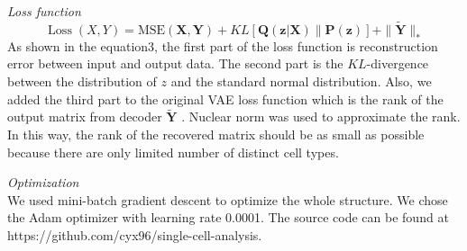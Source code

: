 \vspace{0.5cm}
\noindent\emph{Loss function} \\
\begin{equation}
    \operatorname{Loss}(X, Y)=\text {MSE}(\boldsymbol{X}, \boldsymbol{Y}) + 
    KL[\boldsymbol{Q}(\boldsymbol{z} | \boldsymbol{X}) \| \boldsymbol{P}(\boldsymbol{z})] + \|\mathbf{\widetilde{\boldsymbol{Y}}}\|_{*}
\end{equation}
As shown in the equation3, the first part of the loss function is reconstruction error between input and output data. The second part is the $KL$-divergence between the distribution of $z$ and the standard normal distribution. Also, we added the third part to the original VAE loss function which is the rank of the output matrix from decoder $\widetilde{\boldsymbol{Y}}$ . Nuclear norm was used to approximate the rank. In this way, the rank of the recovered matrix should be as small as possible because there are only limited number of distinct cell types. 

\vspace{0.5cm}
\noindent\emph{Optimization} \\
We used mini-batch gradient descent to optimize the whole structure. We chose the Adam optimizer with learning rate 0.0001. The source code can be found at https://github.com/cyx96/single-cell-analysis.

